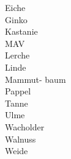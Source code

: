 \documentclass{article}
\begin{document}
Eiche
\newpage
\phantom{ }\\

Ginko
\newpage
\phantom{ }\\

Kastanie
\newpage
\phantom{ }\\

MAV
\newpage
\phantom{ }\\

Lerche
\newpage
\phantom{ }\\

Linde
\newpage
\phantom{ }\\

Mammut-
baum
\newpage
\phantom{ }\\

Pappel
\newpage
\phantom{ }\\

Tanne
\newpage
\phantom{ }\\

Ulme
\newpage
\phantom{ }\\

Wacholder
\newpage
\phantom{ }\\

Walnuss
\newpage
\phantom{ }\\

Weide
\newpage
\end{document}
